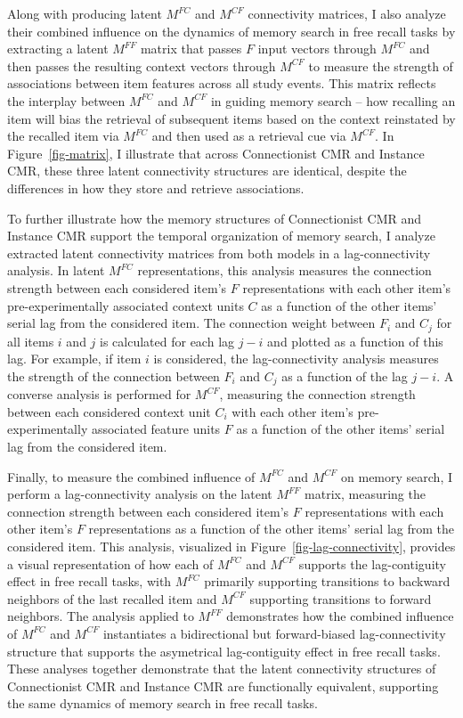 \documentclass[
  letterpaper,
  11pt,
  english,
  singlespacing,
  headsepline]{MastersDoctoralThesis}
\begin{document}
Along with producing latent \(M^{FC}\) and \(M^{CF}\) connectivity
matrices, I also analyze their combined influence on the dynamics of
memory search in free recall tasks by extracting a latent \(M^{FF}\)
matrix that passes \(F\) input vectors through \(M^{FC}\) and then
passes the resulting context vectors through \(M^{CF}\) to measure the
strength of associations between item features across all study events.
This matrix reflects the interplay between \(M^{FC}\) and \(M^{CF}\) in
guiding memory search -- how recalling an item will bias the retrieval
of subsequent items based on the context reinstated by the recalled item
via \(M^{FC}\) and then used as a retrieval cue via \(M^{CF}\). In
Figure~\ref{fig-matrix}, I illustrate that across Connectionist CMR and
Instance CMR, these three latent connectivity structures are identical,
despite the differences in how they store and retrieve associations.

To further illustrate how the memory structures of Connectionist CMR and
Instance CMR support the temporal organization of memory search, I
analyze extracted latent connectivity matrices from both models in a
lag-connectivity analysis. In latent \(M^{FC}\) representations, this
analysis measures the connection strength between each considered item's
\(F\) representations with each other item's pre-experimentally
associated context units \(C\) as a function of the other items' serial
lag from the considered item. The connection weight between \(F_i\) and
\(C_j\) for all items \(i\) and \(j\) is calculated for each lag \(j-i\)
and plotted as a function of this lag. For example, if item \(i\) is
considered, the lag-connectivity analysis measures the strength of the
connection between \(F_i\) and \(C_j\) as a function of the lag \(j-i\).
A converse analysis is performed for \(M^{CF}\), measuring the
connection strength between each considered context unit \(C_i\) with
each other item's pre-experimentally associated feature units \(F\) as a
function of the other items' serial lag from the considered item.

Finally, to measure the combined influence of \(M^{FC}\) and \(M^{CF}\)
on memory search, I perform a lag-connectivity analysis on the latent
\(M^{FF}\) matrix, measuring the connection strength between each
considered item's \(F\) representations with each other item's \(F\)
representations as a function of the other items' serial lag from the
considered item. This analysis, visualized in
Figure~\ref{fig-lag-connectivity}, provides a visual representation of
how each of \(M^{FC}\) and \(M^{CF}\) supports the lag-contiguity effect
in free recall tasks, with \(M^{FC}\) primarily supporting transitions
to backward neighbors of the last recalled item and \(M^{CF}\)
supporting transitions to forward neighbors. The analysis applied to
\(M^{FF}\) demonstrates how the combined influence of \(M^{FC}\) and
\(M^{CF}\) instantiates a bidirectional but forward-biased
lag-connectivity structure that supports the asymetrical lag-contiguity
effect in free recall tasks. These analyses together demonstrate that
the latent connectivity structures of Connectionist CMR and Instance CMR
are functionally equivalent, supporting the same dynamics of memory
search in free recall tasks.
\end{document}
